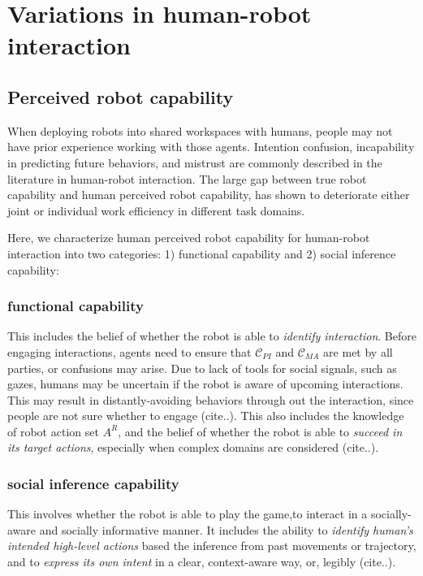 \documentclass[letterpaper, 10 pt, conference]{ieeeconf}  %
\begin{document}
\section{Variations in human-robot interaction}
\subsection{Perceived robot capability}
When deploying robots into shared workspaces with humans, people may not have prior experience working with those agents. Intention confusion, incapability in predicting future behaviors, and mistrust are commonly described in the literature in human-robot interaction. 
The large gap between true robot capability and human perceived robot capability, has shown to deteriorate either joint or individual work efficiency in different task domains.

Here, we characterize human perceived robot capability for human-robot interaction into two categories: 1) functional capability and 2) social inference capability:

\subsubsection{functional capability}
This includes the belief of whether the robot is able to \textit{identify interaction}. Before engaging interactions, agents need to ensure that $\mathcal{C}_{PI}$ and $\mathcal{C}_{MA}$ are met by all parties, or confusions may arise. Due to lack of tools for social signals, such as gazes, humans may be uncertain if the robot is aware of upcoming interactions. This may result in distantly-avoiding behaviors through out the interaction, since people are not sure whether to engage (cite..).
This also includes the knowledge of robot action set $A^R$, and the belief of whether the robot is able to \textit{succeed in its target actions}, especially when complex domains are considered (cite..). 

\subsubsection{social inference capability}
This involves whether the robot is able to play the game,to interact in a socially-aware and socially informative manner. It includes the ability to
\textit{identify human's intended high-level actions} based the inference from past movements or trajectory, and to \textit{express its own intent} in a clear, context-aware way, or, legibly (cite..).
\end{document}

